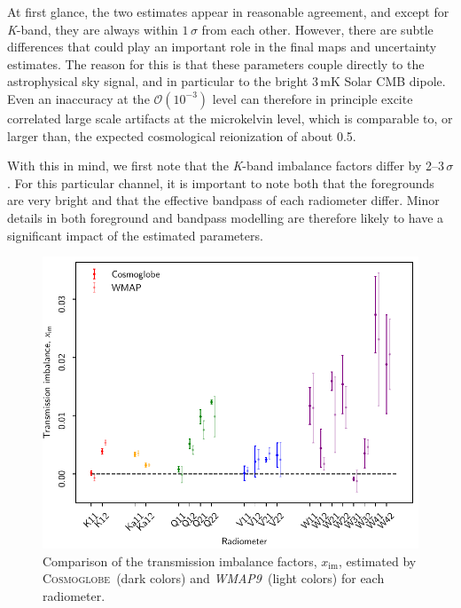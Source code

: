 \documentclass[twocolumn]{../../common/aa}
\def\WMAPnine{\emph{WMAP9}}
\newcommand{\cosmoglobe}{\textsc{Cosmoglobe}}
\newcommand{\K}[0]{\textit K}
\begin{document}
At first glance, the two estimates appear in reasonable agreement, and except for \K-band, they are always within $1\,\sigma$ from each other. However, there are subtle differences that could play an important role in the final maps and uncertainty estimates. The reason for this is that these parameters couple directly to the astrophysical sky signal, and in particular to the bright 3\,mK Solar CMB dipole. Even an inaccuracy at the $\mathcal{O}(10^{-3})$ level can therefore in principle excite correlated large scale artifacts at the microkelvin level, which is comparable to, or larger than, the expected cosmological reionization of about 0.5\muK.

With this in mind, we first note that the \K-band imbalance factors differ by 2--3\,$\sigma$. For this particular channel, it is important to note both that the foregrounds are very bright and that the effective bandpass of each radiometer differ. Minor details in both foreground and bandpass modelling are therefore likely to have a significant impact of the estimated parameters. 

\begin{figure}[t]
	\centering
	\includegraphics[width=\linewidth]{figures/x_im_CG_v1.pdf}
	\caption{Comparison of the transmission imbalance factors, $x_{\mathrm{im}}$, estimated by \cosmoglobe\ (dark colors) and \WMAPnine\ (light colors) for each radiometer.}
	\label{fig:x_im}
\end{figure}
\end{document}
